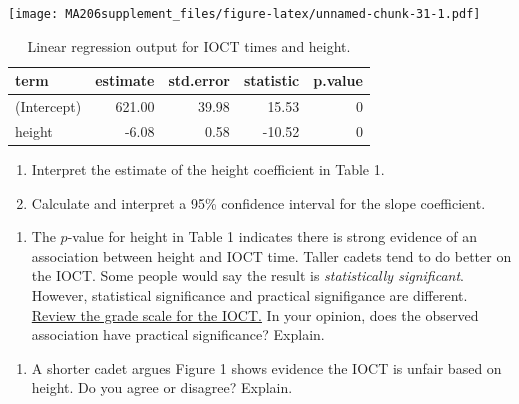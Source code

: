 \documentclass[]{book}
\providecommand{\tightlist}{%
  \setlength{\itemsep}{0pt}\setlength{\parskip}{0pt}}
\begin{document}
\texttt{[image: MA206supplement\_files/figure-latex/unnamed-chunk-31-1.pdf]}

\begin{table}

\caption{\label{tab:unnamed-chunk-31}Linear regression output for IOCT times and height.}
\centering
\begin{tabular}[t]{l|r|r|r|r}
\hline
term & estimate & std.error & statistic & p.value\\
\hline
(Intercept) & 621.00 & 39.98 & 15.53 & 0\\
\hline
height & -6.08 & 0.58 & -10.52 & 0\\
\hline
\end{tabular}
\end{table}

\begin{enumerate}
\def\labelenumi{\arabic{enumi}.}
\setcounter{enumi}{4}
\item
  Interpret the estimate of the height coefficient in Table 1.

  \vspace{1in}
\item
  Calculate and interpret a 95\% confidence interval for the slope coefficient.
\end{enumerate}

\vspace{1in}

\newpage

\begin{enumerate}
\def\labelenumi{\arabic{enumi}.}
\setcounter{enumi}{6}
\tightlist
\item
  The \(p\)-value for height in Table 1 indicates there is strong evidence of an association between height and IOCT time. Taller cadets tend to do better on the IOCT. Some people would say the result is \emph{statistically significant}. However, statistical significance and practical signifigance are different. \href{https://en.wikipedia.org/wiki/Indoor_Obstacle_Course_Test}{Review the grade scale for the IOCT.} In your opinion, does the observed association have practical significance? Explain.
\end{enumerate}

\vspace{1in}

\begin{enumerate}
\def\labelenumi{\arabic{enumi}.}
\setcounter{enumi}{7}
\tightlist
\item
  A shorter cadet argues Figure 1 shows evidence the IOCT is unfair based on height. Do you agree or disagree? Explain.
\end{enumerate}
\end{document}
